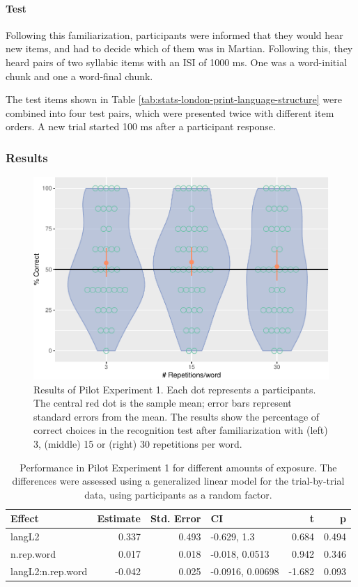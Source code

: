 \documentclass[
]{article}
\begin{document}
\paragraph{Test}\label{test}

Following this familiarization, participants were informed that they
would hear new items, and had to decide which of them was in Martian.
Following this, they heard pairs of two syllabic items with an ISI of
1000 ms. One was a word-initial chunk and one a word-final chunk.

The test items shown in Table
\ref{tab:stats-london-print-language-structure} were combined into four
test pairs, which were presented twice with different item orders. A new
trial started 100 ms after a participant response.

\subsubsection{Results}\label{results-1}

\begin{figure}

{\centering \includegraphics[width=0.8\linewidth]{segmentation_recall_combined_for_revision4_files/figure-latex/bcn-plot-stats-1} 

}

\caption{Results of Pilot Experiment 1. Each dot represents a participants. The central red dot is the sample mean; error bars represent standard errors from the mean. The results show the percentage of correct choices in the recognition test after familiarization with (left) 3, (middle) 15  or (right) 30 repetitions per word.}\label{fig:bcn-plot-stats}
\end{figure}

\begin{longtable}[t]{lrrlrr}
\caption{\label{tab:bcn-glmm-print}Performance in Pilot Experiment 1 for different amounts of exposure. The differences were assessed using a generalized linear model for the trial-by-trial data, using participants as a random factor.}\\
\toprule
Effect & Estimate & Std. Error & CI & t & p\\
\midrule
langL2 & 0.337 & 0.493 & -0.629, 1.3 & 0.684 & 0.494\\
n.rep.word & 0.017 & 0.018 & -0.018, 0.0513 & 0.942 & 0.346\\
langL2:n.rep.word & -0.042 & 0.025 & -0.0916, 0.00698 & -1.682 & 0.093\\
\bottomrule
\end{longtable}
\end{document}

